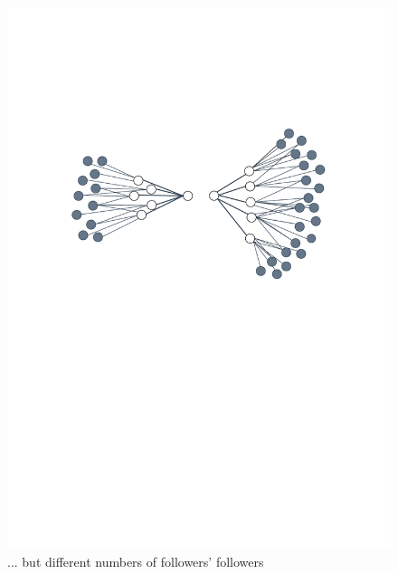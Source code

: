\begin{figure}
\begin{center}
\begin{subtable}{1\textwidth}
        \includegraphics[scale=.6]{figures/followers/follower2}
        \caption{... but different numbers of followers' followers}
        \label{fig:follower2}
    \end{subtable}
    \begin{subtable}{1\textwidth}
     \centering

\end{subtable}
\end{center}
\end{figure}
